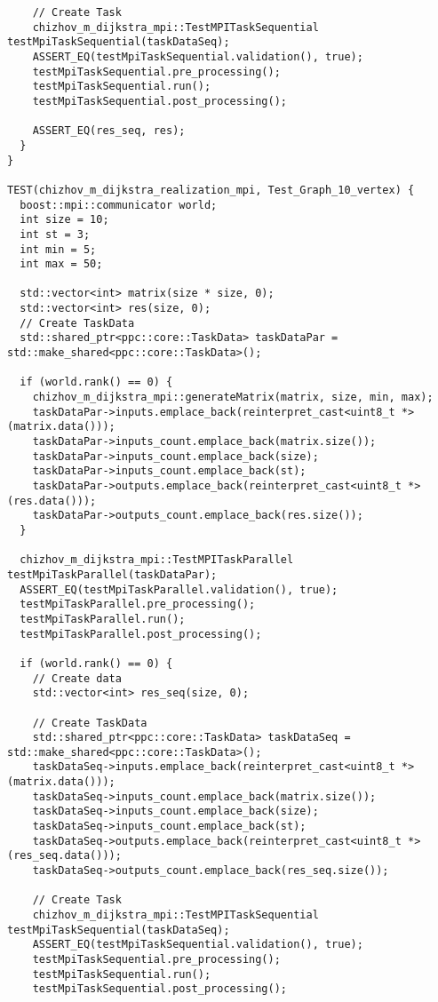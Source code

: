 \documentclass[a4paper, 14pt]{extarticle}
\begin{document}
\begin{lstlisting}
    // Create Task
    chizhov_m_dijkstra_mpi::TestMPITaskSequential testMpiTaskSequential(taskDataSeq);
    ASSERT_EQ(testMpiTaskSequential.validation(), true);
    testMpiTaskSequential.pre_processing();
    testMpiTaskSequential.run();
    testMpiTaskSequential.post_processing();

    ASSERT_EQ(res_seq, res);
  }
}

TEST(chizhov_m_dijkstra_realization_mpi, Test_Graph_10_vertex) {
  boost::mpi::communicator world;
  int size = 10;
  int st = 3;
  int min = 5;
  int max = 50;

  std::vector<int> matrix(size * size, 0);
  std::vector<int> res(size, 0);
  // Create TaskData
  std::shared_ptr<ppc::core::TaskData> taskDataPar = std::make_shared<ppc::core::TaskData>();

  if (world.rank() == 0) {
    chizhov_m_dijkstra_mpi::generateMatrix(matrix, size, min, max);
    taskDataPar->inputs.emplace_back(reinterpret_cast<uint8_t *>(matrix.data()));
    taskDataPar->inputs_count.emplace_back(matrix.size());
    taskDataPar->inputs_count.emplace_back(size);
    taskDataPar->inputs_count.emplace_back(st);
    taskDataPar->outputs.emplace_back(reinterpret_cast<uint8_t *>(res.data()));
    taskDataPar->outputs_count.emplace_back(res.size());
  }

  chizhov_m_dijkstra_mpi::TestMPITaskParallel testMpiTaskParallel(taskDataPar);
  ASSERT_EQ(testMpiTaskParallel.validation(), true);
  testMpiTaskParallel.pre_processing();
  testMpiTaskParallel.run();
  testMpiTaskParallel.post_processing();

  if (world.rank() == 0) {
    // Create data
    std::vector<int> res_seq(size, 0);

    // Create TaskData
    std::shared_ptr<ppc::core::TaskData> taskDataSeq = std::make_shared<ppc::core::TaskData>();
    taskDataSeq->inputs.emplace_back(reinterpret_cast<uint8_t *>(matrix.data()));
    taskDataSeq->inputs_count.emplace_back(matrix.size());
    taskDataSeq->inputs_count.emplace_back(size);
    taskDataSeq->inputs_count.emplace_back(st);
    taskDataSeq->outputs.emplace_back(reinterpret_cast<uint8_t *>(res_seq.data()));
    taskDataSeq->outputs_count.emplace_back(res_seq.size());

    // Create Task
    chizhov_m_dijkstra_mpi::TestMPITaskSequential testMpiTaskSequential(taskDataSeq);
    ASSERT_EQ(testMpiTaskSequential.validation(), true);
    testMpiTaskSequential.pre_processing();
    testMpiTaskSequential.run();
    testMpiTaskSequential.post_processing();


\end{lstlisting}
\end{document}
